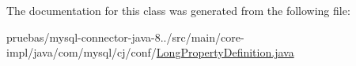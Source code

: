 The documentation for this class was generated from the following file\+:\begin{DoxyCompactItemize}
\item 
pruebas/mysql-\/connector-\/java-\/8../src/main/core-\/impl/java/com/mysql/cj/conf/\mbox{\hyperlink{_long_property_definition_8java}{Long\+Property\+Definition.\+java}}\end{DoxyCompactItemize}
